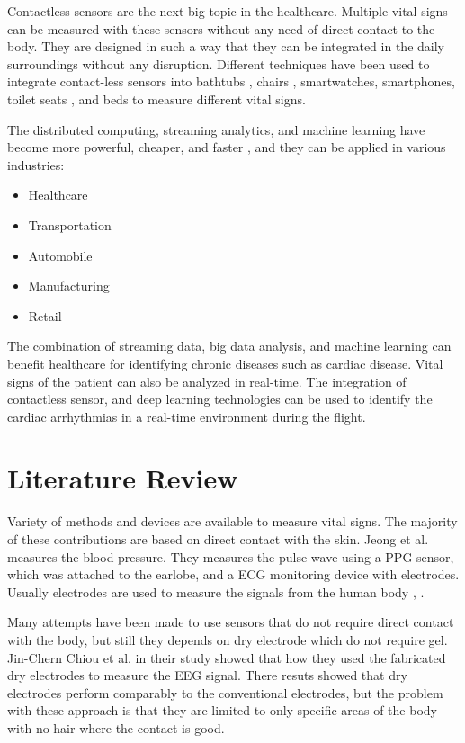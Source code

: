 Contactless sensors are the next big topic in the healthcare. Multiple vital signs can be measured with these sensors without any need of  direct contact to the body. They are designed in such a way that they can be integrated in the daily surroundings without any disruption. Different techniques have been used to integrate contact-less sensors into bathtubs \cite{lim2004ecg}, chairs \cite{aleksandrowicz2007wireless}, smartwatches, smartphones, toilet seats \cite{kim2004electrically}, and beds \cite{wu2008contactless} to measure different vital signs. 

The distributed computing, streaming analytics, and machine learning have become more powerful, cheaper, and faster \cite{maprmliotmed}, and they can be applied in various industries:

\begin{itemize}
	\item Healthcare
	\item Transportation
	\item Automobile
	\item Manufacturing
	\item Retail
\end{itemize}


The combination of streaming data, big data analysis, and machine learning can benefit healthcare for identifying chronic diseases such as cardiac disease. Vital signs of the patient can also be analyzed in real-time. The integration of contactless sensor, and deep learning technologies can be used to identify the cardiac arrhythmias in a real-time environment during the flight.

\section{Literature Review}

Variety of methods and devices are available to measure vital signs. The majority of these contributions are based on direct contact with the skin. Jeong et al. \cite{jeong2005continuous} measures the blood pressure. They measures the pulse wave using a PPG sensor, which was attached to the earlobe, and a ECG monitoring device with electrodes. Usually electrodes are used to measure the signals from the human body \cite{shen2007detection}, \cite{neuman1998biopotential}.

Many attempts have been made to use sensors that do not require direct contact with the body, but still they depends on dry electrode which do not require gel. Jin-Chern Chiou et al. in their study \cite{4600301} showed that how they used the fabricated dry electrodes to measure the EEG signal. There resuts showed that dry electrodes perform comparably to the conventional electrodes, but the problem with these approach is that they are limited to only specific areas of the body with no hair where the contact is good.

